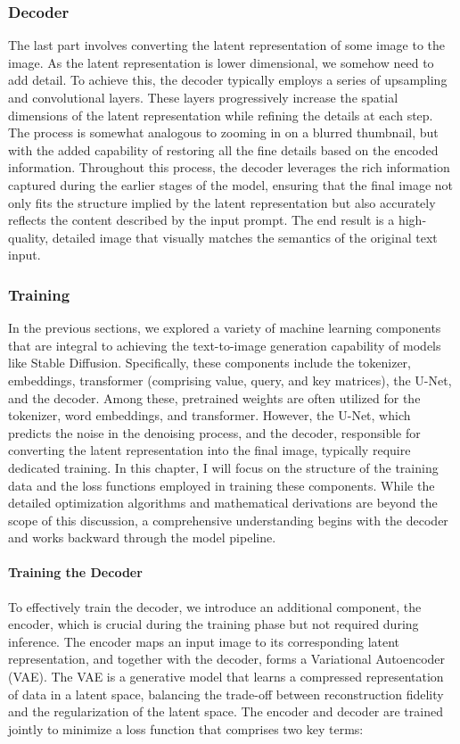 \documentclass[11pt]{article}
\begin{document}
\subsubsection{Decoder}
The last part involves converting the latent representation of some image to the image. As the latent representation is lower dimensional, we somehow need to add detail. To achieve this, the decoder typically employs a series of upsampling and convolutional layers. These layers progressively increase the spatial dimensions of the latent representation while refining the details at each step. The process is somewhat analogous to zooming in on a blurred thumbnail, but with the added capability of restoring all the fine details based on the encoded information.
Throughout this process, the decoder leverages the rich information captured during the earlier stages of the model, ensuring that the final image not only fits the structure implied by the latent representation but also accurately reflects the content described by the input prompt. The end result is a high-quality, detailed image that visually matches the semantics of the original text input.


\subsubsection{Training}
In the previous sections, we explored a variety of machine learning components that are integral to achieving the text-to-image generation capability of models like Stable Diffusion. Specifically, these components include the tokenizer, embeddings, transformer (comprising value, query, and key matrices), the U-Net, and the decoder. Among these, pretrained weights are often utilized for the tokenizer, word embeddings, and transformer. However, the U-Net, which predicts the noise in the denoising process, and the decoder, responsible for converting the latent representation into the final image, typically require dedicated training. In this chapter, I will focus on the structure of the training data and the loss functions employed in training these components. While the detailed optimization algorithms and mathematical derivations are beyond the scope of this discussion, a comprehensive understanding begins with the decoder and works backward through the model pipeline.

\paragraph{Training the Decoder}
To effectively train the decoder, we introduce an additional component, the encoder, which is crucial during the training phase but not required during inference. The encoder maps an input image to its corresponding latent representation, and together with the decoder, forms a Variational Autoencoder (VAE)\cite{kingma2022autoencodingvariationalbayes}. The VAE is a generative model that learns a compressed representation of data in a latent space, balancing the trade-off between reconstruction fidelity and the regularization of the latent space. The encoder and decoder are trained jointly to minimize a loss function that comprises two key terms:
\end{document}
